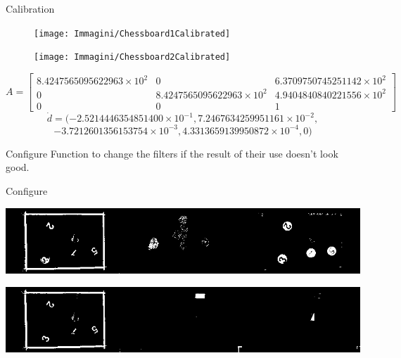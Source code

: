 \begin{frame}{Calibration}
	\begin{figure}[H]
		\begin{minipage}{0.48\linewidth}
			\texttt{[image: Immagini/Chessboard1Calibrated]}
		\end{minipage}
		\vspace{0.04\linewidth}
		\begin{minipage}{0.48\linewidth}
			\texttt{[image: Immagini/Chessboard2Calibrated]}
		\end{minipage}
	\end{figure}
	\stsize
	\[A=\begin{bmatrix}
		8.4247565095622963\times10^2 & 0 & 6.3709750745251142\times10^2\\
		0 & 8.4247565095622963\times10^2 & 4.9404840840221556\times10^2\\
		0 & 0 & 1
	\end{bmatrix}\]\[
	\dot{d}=(-2.5214446354851400\times10^{-1}, 7.2467634259951161\times10^{-2},\]\[-3.7212601356153754\times10^{-3}, 4.3313659139950872\times10^{-4}, 0)
	\]
\end{frame}

\begin{frame}[fragile]{Configure}
Function to change the filters if the result of their use doesn't look good.
\end{frame}

\begin{frame}[fragile]{Configure}
\begin{center}
\includegraphics[width=\linewidth]{Immagini/configure1}
\end{center}
\begin{center}
\includegraphics[width=\linewidth]{Immagini/configure2}
\end{center}
\end{frame}

